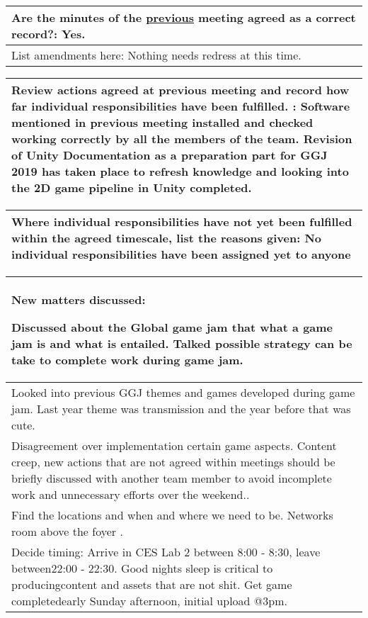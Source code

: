 \documentclass{article}
\begin{document}
\begin{table}[H]
	\centering
	\begin{tabular}{| p{12cm}  |}
	\hline
	Are the minutes of the \underline{previous} meeting agreed as a correct record?: Yes.\\ \hline
	List amendments here: Nothing needs redress at this time.
\\ \hline
\end{tabular}
\end{table}

\begin{table}[H]
	\centering
	\begin{tabular}{| p{12cm}  |}
	\hline
	Review actions agreed at previous meeting and record how far individual responsibilities have been fulfilled. : Software mentioned in previous meeting installed  and  checked working  correctly by all the members of the team.   Revision  of  Unity  Documentation as a preparation part for GGJ 2019 has taken place to refresh knowledge and looking into the 2D game pipeline in Unity completed.  \\ \hline
\end{tabular}
\end{table}

\begin{table}[H]
	\centering
	\begin{tabular}{| p{12cm}  |}
	\hline
	Where individual responsibilities have not yet been fulfilled within the agreed timescale, list the reasons given: No individual responsibilities have been assigned yet to anyone\\ \hline
\end{tabular}
\end{table}

\begin{table}[H]
	\centering
	\begin{tabular}{| p{12cm}  |}
	\hline
	New matters discussed: 
	
	Discussed about the Global game jam that what a game jam is and what is entailed.  Talked possible strategy can be take to complete work during game jam.\\ \hline
	Looked into previous GGJ themes and games developed during game jam.  Last year theme was transmission and the year before that was cute.\\ \hline
	Disagreement over implementation certain game aspects.    Content  creep,  new  actions  that  are  not  agreed within  meetings  should  be  briefly  discussed  with  another team member to avoid incomplete work and unnecessary efforts  over the weekend..\\ \hline
	Find the locations and when and where we need to be.  Networks room above the foyer .\\ \hline
	Decide timing: Arrive  in  CES  Lab  2  between  8:00  -  8:30,  leave  between22:00  -  22:30.   Good  nights  sleep  is  critical  to  producingcontent and assets that are not shit.  Get game completedearly Sunday afternoon, initial upload @3pm.\\ \hline
	
\end{tabular}
\end{table}
\end{document}
